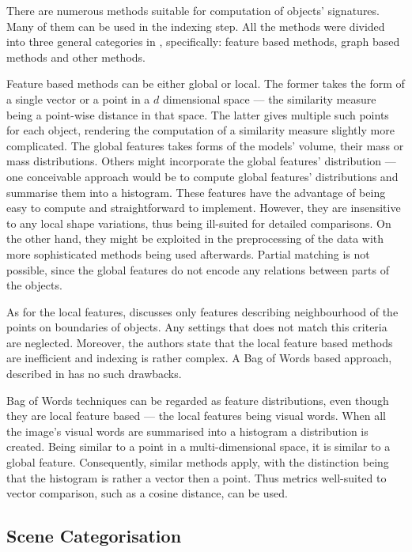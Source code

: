   There are numerous methods suitable for computation of objects' signatures. Many of them can be used in the indexing step. All the methods were divided into three general categories in \cite{toldo2009bag}, specifically: feature based methods, graph based methods and other methods. 
   
  Feature based methods can be either global or local. The former takes the form of a single vector or a point in a $d$ dimensional space --- the similarity measure being a point-wise distance in that space. The latter gives multiple such points for each object, rendering the computation of a similarity measure slightly more complicated. The global features takes forms of the models' volume, their mass or mass distributions. Others might incorporate the global features' distribution --- one conceivable approach would be to compute global features' distributions and summarise them into a histogram. These features have the advantage of being easy to compute and straightforward to implement. However, they are insensitive to any local shape variations, thus being ill-suited for detailed comparisons. On the other hand, they might be exploited in the preprocessing of the data with more sophisticated methods being used afterwards. Partial matching is not possible, since the global features do not encode any relations between parts of the objects.
   
  As for the local features, \cite{toldo2009bag} discusses only features describing neighbourhood of the points on boundaries of objects. Any settings that does not match this criteria are neglected. Moreover, the authors state that the local feature based methods are inefficient and indexing is rather complex. A Bag of Words based approach, described in \cite{li2010investigating} has no such drawbacks.
   
	Bag of Words techniques can be regarded as feature distributions, even though they are local feature based --- the local features being visual words. When all the image's visual words are summarised into a histogram a distribution is created. Being similar to a point in a multi-dimensional space, it is similar to a global feature. Consequently, similar methods apply, with the distinction being that the histogram is rather a vector then a point. Thus metrics well-suited to vector comparison, such as a cosine distance, can be used.
  
  \subsection{Scene Categorisation}
  
